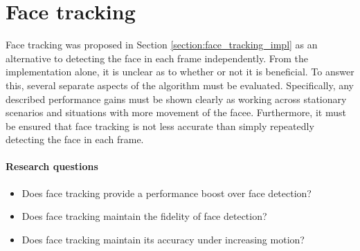 \section{Face tracking}
\label{section:face_tracking}
Face tracking was proposed in Section \ref{section:face_tracking_impl} as an alternative to detecting the face in each frame independently.
From the implementation alone, it is unclear as to whether or not it is beneficial. To answer this, several separate aspects of the algorithm must be evaluated. 
Specifically, any described performance gains must be shown clearly as working across stationary scenarios and situations with more movement of the facee. Furthermore, it must be ensured that face tracking is not less accurate than simply repeatedly detecting the face in each frame.
\paragraph{Research questions}
\begin{itemize}
    \item Does face tracking provide a performance boost over face detection?
    \item Does face tracking maintain the fidelity of face detection?
    \item Does face tracking maintain its accuracy under increasing motion?
\end{itemize}

